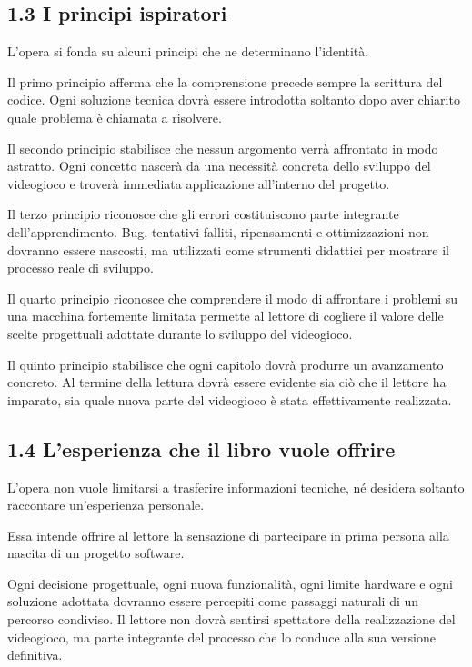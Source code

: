 \documentclass{article}
\begin{document}
\subsection{1.3 I principi ispiratori}
L'opera si fonda su alcuni principi che ne determinano l'identità.

Il primo principio afferma che la comprensione precede sempre la scrittura del codice. Ogni soluzione tecnica dovrà
essere introdotta soltanto dopo aver chiarito quale problema è chiamata a risolvere.

Il secondo principio stabilisce che nessun argomento verrà affrontato in modo astratto. Ogni concetto nascerà da una
necessità concreta dello sviluppo del videogioco e troverà immediata applicazione all'interno del progetto.

Il terzo principio riconosce che gli errori costituiscono parte integrante dell'apprendimento. Bug, tentativi falliti,
ripensamenti e ottimizzazioni non dovranno essere nascosti, ma utilizzati come strumenti didattici per mostrare il
processo reale di sviluppo.

Il quarto principio riconosce che comprendere il modo di affrontare i problemi su una macchina fortemente limitata
permette al lettore di cogliere il valore delle scelte progettuali adottate durante lo sviluppo del videogioco.

Il quinto principio stabilisce che ogni capitolo dovrà produrre un avanzamento concreto. Al termine della lettura dovrà
essere evidente sia ciò che il lettore ha imparato, sia quale nuova parte del videogioco è stata effettivamente
realizzata.

\subsection[1.4 L{}'esperienza che il libro vuole offrire]{1.4 L'esperienza che il libro vuole offrire}
L'opera non vuole limitarsi a trasferire informazioni tecniche, né desidera soltanto raccontare un'esperienza personale.

Essa intende offrire al lettore la sensazione di partecipare in prima persona alla nascita di un progetto software.

Ogni decisione progettuale, ogni nuova funzionalità, ogni limite hardware e ogni soluzione adottata dovranno essere
percepiti come passaggi naturali di un percorso condiviso. Il lettore non dovrà sentirsi spettatore della realizzazione
del videogioco, ma parte integrante del processo che lo conduce alla sua versione definitiva.
\end{document}
